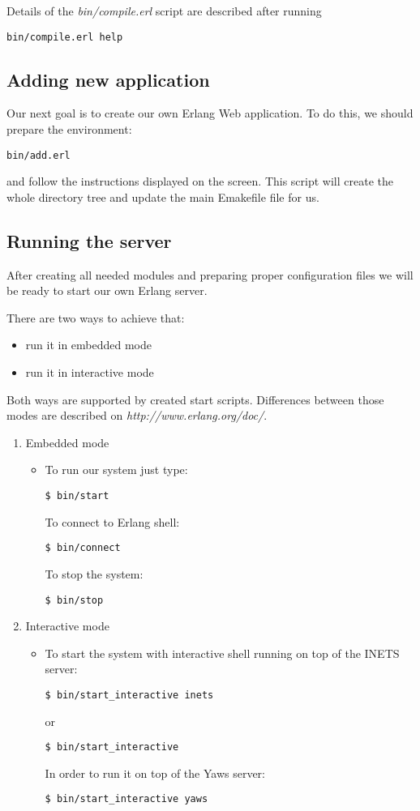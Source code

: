 Details of the {\it bin/compile.erl} script are described after running
\begin{verbatim}
bin/compile.erl help
\end{verbatim}

\subsection{Adding new application}Our next goal is to create our own Erlang Web application. To do this, we should prepare the environment:
\begin{verbatim}
bin/add.erl 
\end{verbatim}
and follow the instructions displayed on the screen. This script will create the whole directory tree and update the main Emakefile file for us. 

\subsection{Running the server}After creating all needed modules and preparing proper configuration files we will be ready to start our own Erlang server.

There are two ways to achieve that:
\begin{itemize}
\item run it in embedded mode
\item run it in interactive mode
\end{itemize}
Both ways are supported by created start scripts. Differences between those modes are described on {\it http://www.erlang.org/doc/}.

\begin{enumerate}
\item Embedded mode
\begin{itemize}
\item To run our system just type:
\begin{verbatim}
$ bin/start
\end{verbatim}
To connect to Erlang shell:
\begin{verbatim}
$ bin/connect
\end{verbatim}
To stop the system:
\begin{verbatim}
$ bin/stop
\end{verbatim}
\end{itemize}

\item Interactive mode
\begin{itemize}
\item To start the system with interactive shell running on top of the INETS server:
\begin{verbatim}
$ bin/start_interactive inets
\end{verbatim}
or
\begin{verbatim}
$ bin/start_interactive
\end{verbatim}
In order to run it on top of the Yaws server:
\begin{verbatim}
$ bin/start_interactive yaws
\end{verbatim}
\end{itemize}
\end{enumerate}
